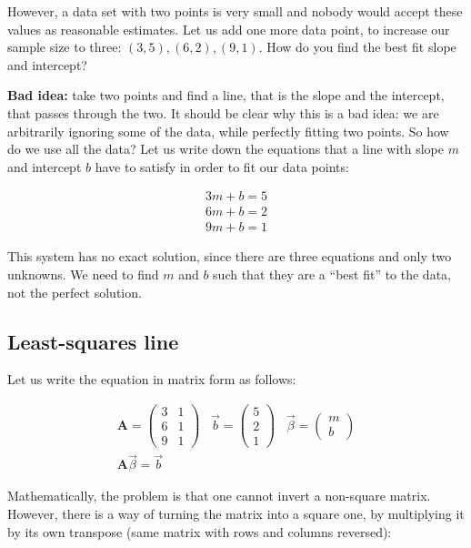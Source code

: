 \documentclass[
  letterpaper,
  DIV=11,
  numbers=noendperiod]{scrreprt}
\begin{document}
However, a data set with two points is very small and nobody would
accept these values as reasonable estimates. Let us add one more data
point, to increase our sample size to three: \((3,5), (6, 2), (9, 1)\).
How do you find the best fit slope and intercept?

\textbf{Bad idea:} take two points and find a line, that is the slope
and the intercept, that passes through the two. It should be clear why
this is a bad idea: we are arbitrarily ignoring some of the data, while
perfectly fitting two points. So how do we use all the data? Let us
write down the equations that a line with slope \(m\) and intercept
\(b\) have to satisfy in order to fit our data points:

\[
\begin{aligned}
3m + b = 5 \\
6m + b = 2\\
9m + b = 1
\end{aligned}
\]

This system has no exact solution, since there are three equations and
only two unknowns. We need to find \(m\) and \(b\) such that they are a
``best fit'' to the data, not the perfect solution.

\subsection{Least-squares line}\label{least-squares-line}

Let us write the equation in matrix form as follows:

\[
\begin{aligned}
\mathbf{A} = \begin{pmatrix} 3 & 1 \\ 6 & 1 \\ 9 & 1 \end{pmatrix} \;\;\; \vec{b} = \begin{pmatrix}5 \\ 2 \\ 1 \end{pmatrix} \;\;\;
\vec{\beta} = \begin{pmatrix} m \\ b \end{pmatrix} \\
\mathbf{A} \vec \beta = \vec b 
\end{aligned}
\]

Mathematically, the problem is that one cannot invert a non-square
matrix. However, there is a way of turning the matrix into a square one,
by multiplying it by its own transpose (same matrix with rows and
columns reversed):
\end{document}
